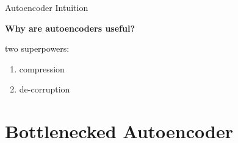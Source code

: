 \begin{frame}{Autoencoder Intuition}

{\Large
\textbf{Why are autoencoders useful?}
}

\pause

\vspace{4ex}

{\Large
two superpowers:

\pause

\begin{enumerate}

\item compression 

\pause

\item de-corruption 

\end{enumerate}
}

\end{frame}

\section{Bottlenecked Autoencoder}

